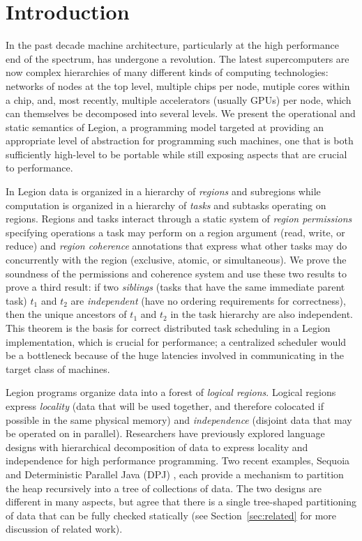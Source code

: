 

\section{Introduction}
\label{sec:intro}

In the past decade machine architecture, particularly at the high
performance end of the spectrum, has undergone a revolution.  The
latest supercomputers are now complex hierarchies of many different
kinds of computing technologies: networks of nodes at the top level,
multiple chips per node, mutiple cores within a chip, and, most
recently, multiple accelerators (usually GPUs) per node, which 
can themselves be decomposed into several levels.   We present the operational and static
semantics of Legion, a programming model targeted at providing an
appropriate level of abstraction for programming such machines, one
that is both sufficiently high-level to be portable while still
exposing aspects that are crucial to performance. 

In Legion data is organized in a hierarchy of {\em regions}
and subregions while computation is organized in a hierarchy of {\em
tasks} and subtasks operating on regions.  Regions and tasks interact
through a static system of {\em region permissions} specifying 
operations a task may perform on a region argument (read,
write, or reduce) and  {\em region coherence} annotations that
express what other tasks may do concurrently with
the region (exclusive, atomic, or simultaneous).  We prove the
soundness of the permissions and coherence system and use these two
results to prove a third result: if two {\em siblings} (tasks that
have the same immediate parent task) $t_1$ and $t_2$ are 
{\em independent} (have no ordering requirements for correctness), 
then the unique ancestors of $t_1$ and $t_2$ in the task hierarchy 
are also independent.  This theorem is the basis for correct distributed
task scheduling in a Legion implementation, which is crucial for
performance; a centralized scheduler would be a bottleneck
because of the huge latencies involved in communicating in the target
class of machines.

Legion programs organize data into a forest of {\em logical regions}.  Logical
regions express {\em locality} (data that will be used together, and therefore colocated if possible in the same
physical memory) and {\em independence} (disjoint data that may be operated on in parallel).
Researchers have previously explored language designs with hierarchical decomposition of data to express
locality and independence for high performance programming. Two recent examples, Sequoia \cite{Fatahalian06} and 
Deterministic Parallel Java (DPJ) \cite{Bocchino09}, each provide a mechanism to partition the heap recursively
into a tree of collections of data.  The two designs are different in many aspects, but agree that there is
a single tree-shaped partitioning of data that can be fully checked statically (see Section~\ref{sec:related} for more
discussion of related work).

